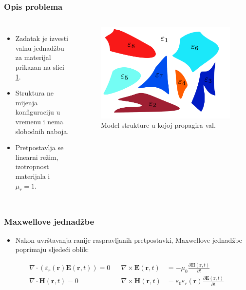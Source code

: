 \documentclass{beamer}
\begin{document}
\begin{frame}
	\frametitle{Opis problema}
	\begin{columns}
		\begin{itemize}
			\item Zadatak je izvesti valnu jednadžbu za materijal prikazan na
				slici \ref{fig:structure}.
			\item Struktura ne mijenja konfiguraciju u vremenu i nema slobodnih
				naboja.
			\item Pretpostavlja se linearni režim, izotropnost materijala i
				$\mu_r = 1$.
		\end{itemize}
		\begin{figure}[ht]
			\centering
			\includegraphics[width = \linewidth]
				{./images/pdf/structure-model.pdf}
			\caption{Model strukture u kojoj propagira val.}
			\label{fig:structure}
		\end{figure}
	\end{columns}
\end{frame}


\begin{frame}
	\frametitle{Maxwellove jednadžbe}
	\begin{itemize}
		\item[] Nakon uvrštavanja ranije raspravljanih pretpostavki, Maxwellove
			jednadžbe poprimaju sljedeći oblik:
	\end{itemize}

	\begin{align*} \label{eq:maxwell2}
		\nabla \cdot (\varepsilon_r(\mathbf{r}) \mathbf{E}(\mathbf{r}, t)) = 0 &&
		\nabla \times \mathbf{E}(\mathbf{r}, t) &=
			- \mu_0
			\frac{\partial \mathbf{H}(\mathbf{r}, t)}{\partial t}  \nonumber \\
		\nabla \cdot \mathbf{H}(\mathbf{r}, t) = 0 &&
		\nabla \times \mathbf{H}(\mathbf{r}, t) &=
			\varepsilon_0 \varepsilon_r(\mathbf{r})
			\frac{\partial \mathbf{E}(\mathbf{r}, t)}{\partial t}
	\end{align*}
\end{frame}
\end{document}
